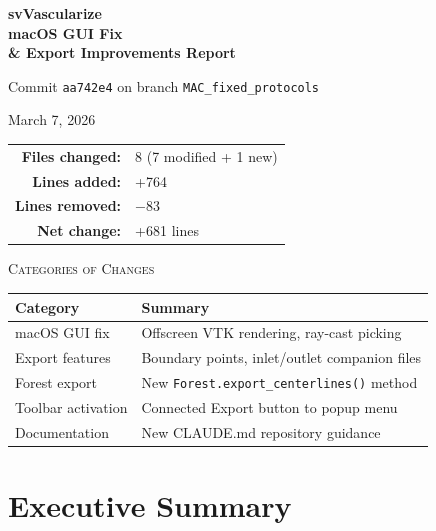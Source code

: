 \documentclass[11pt,a4paper]{article}
\begin{document}
\begin{titlepage}
\centering
\vspace*{3cm}
{\Huge\bfseries svVascularize\\[0.3em] macOS GUI Fix\\[0.3em] \& Export Improvements Report\par}
\vspace{1.5cm}
{\Large Commit \texttt{aa742e4} on branch \texttt{MAC\_fixed\_protocols}\par}
\vspace{1cm}
{\large March 7, 2026\par}
\vspace{2cm}

\begin{tabular}{rl}
\textbf{Files changed:} & 8 (7 modified + 1 new) \\
\textbf{Lines added:} & +764 \\
\textbf{Lines removed:} & $-$83 \\
\textbf{Net change:} & +681 lines \\
\end{tabular}

\vspace{2cm}

{\large\textsc{Categories of Changes}}\\[0.5em]
\begin{tabular}{ll}
\toprule
Category & Summary \\
\midrule
macOS GUI fix & Offscreen VTK rendering, ray-cast picking \\
Export features & Boundary points, inlet/outlet companion files \\
Forest export & New \texttt{Forest.export\_centerlines()} method \\
Toolbar activation & Connected Export button to popup menu \\
Documentation & New CLAUDE.md repository guidance \\
\bottomrule
\end{tabular}

\vfill
\end{titlepage}

\tableofcontents
\newpage

\section{Executive Summary}
\end{document}
